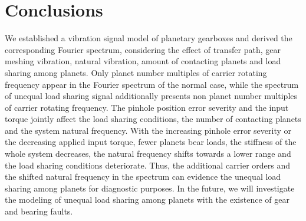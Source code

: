 \documentclass[a4paper,fleqn]{cas-sc}%
\begin{document}
\section{Conclusions \label{sec:conclusions}}
\par We established a vibration signal model of planetary gearboxes and derived the corresponding Fourier spectrum, considering the effect of transfer path, gear meshing vibration, natural vibration, amount of contacting planets and load sharing among planets. Only planet number multiples of carrier rotating frequency appear in the Fourier spectrum of the normal case, while the spectrum of unequal load sharing signal additionally presents non planet number multiples of carrier rotating frequency. The pinhole position error severity and the input torque jointly affect the load sharing conditions, the number of contacting planets and the system natural frequency. With the increasing pinhole error severity or the decreasing applied input torque, fewer planets bear loads, the stiffness of the whole system decreases, the natural frequency shifts towards a lower range and the load sharing conditions deteriorate. Thus, the additional carrier orders and the shifted natural frequency in the spectrum can evidence the unequal load sharing among planets for diagnostic purposes. In the future, we will investigate the modeling of unequal load sharing among planets with the existence of gear and bearing faults.
\end{document}
